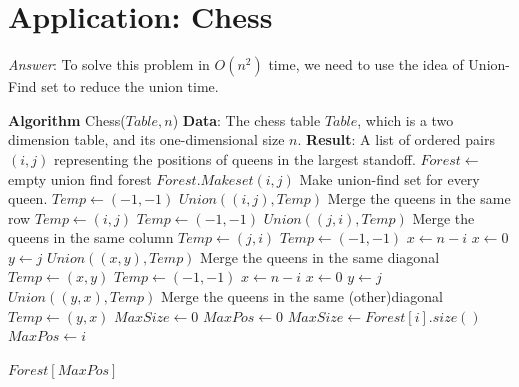 \documentclass[11pt]{article}
\begin{document}
\section{Application: Chess}
\noindent \emph{Answer}: To solve this problem in $O(n^2)$ time, we need to use the idea of Union-Find set to reduce the union time. 
\begin{algorithmic}
	\State \textbf{Algorithm} Chess($Table,n$)
	\State \textbf{Data}: The chess table $Table$, which is a two dimension table, and its one-dimensional size $n$.
	\State \textbf{Result}: A list of ordered pairs $(i,j)$ representing the positions of queens in the largest standoff.
	\State $Forest\gets$ empty union find forest
				\State $Forest.Makeset(i,j)$ \Comment Make union-find set for every queen.
			\EndIf
		\EndFor
	\EndFor
		\State $Temp \gets (-1,-1)$
					\State $Union((i,j), Temp)$ \Comment Merge the queens in the same row 
				\EndIf
				\State $Temp \gets (i,j)$
			\EndIf
		\EndFor
	\EndFor
		\State $Temp \gets (-1,-1)$
					\State $Union((j,i), Temp)$ \Comment Merge the queens in the same column
				\EndIf
				\State $Temp \gets (j,i)$
			\EndIf
		\EndFor
	\EndFor
		\State $Temp \gets (-1,-1)$
			\State $x\gets n-i$
		\Else
			\State $x\gets 0$
		\EndIf
		\State $y \gets j$
					\State $Union((x,y), Temp)$ \Comment Merge the queens in the same diagonal
				\EndIf
				\State $Temp \gets (x,y)$
			\EndIf
		\EndFor
	\EndFor
		\State $Temp \gets (-1,-1)$
				\State $x\gets n-i$
			\Else
				\State $x\gets 0$
			\EndIf
				\State $y \gets j$
					\State $Union((y,x), Temp)$ \Comment Merge the queens in the same (other)diagonal
				\EndIf
				\State $Temp \gets (y,x)$
			\EndIf
		\EndFor
	\EndFor
	\State $MaxSize\gets 0$
	\State $MaxPos \gets 0$
			\State $MaxSize \gets Forest[i].size()$
			\State $MaxPos \gets i$
		\EndIf
	\EndFor
	
	\State \Return $Forest[MaxPos]$
\end{algorithmic}
\end{document}
